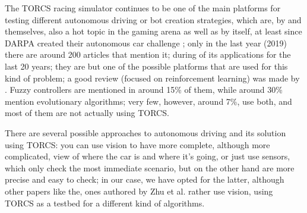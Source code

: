 \documentclass[10pt,journal,compsoc]{IEEEtran}
\begin{document}


The TORCS racing simulator continues to be one of the main platforms
for testing different autonomous driving or bot creation strategies,
which are, by and themselves, also a hot topic in the gaming arena as
well as by itself, at least since DARPA created their autonomous car
challenge \cite{badue2019selfdriving};
only in the last year (2019) there are around 200 articles that
mention it; during  \cite{schiavullo2019torcs} of its
applications for the last 20 years; they are but one of the possible
platforms that are used for this kind of problem; a good review
(focused on reinforcement learning) was made by
\cite{abuzekry2comparative}. Fuzzy controllers are mentioned in around
15\% of them, while around 30\% mention evolutionary algorithms; very
few, however, around 7\%, use both, and most of them are not actually
using TORCS.

There are several possible approaches to autonomous driving and its
solution using TORCS: you can use vision to have more complete,
although more complicated, view of where the car is and where it's
going, or just use sensors, which only check the most immediate
scenario, but on the other hand are more precise and easy to check; in
our case, we have opted for the latter, although other papers like the,
ones authored by Zhu et al. \cite{zhu2018driving,zhu2019vision,neurone} rather
use vision, using TORCS as a testbed for a different kind of algorithms.


\end{document}

